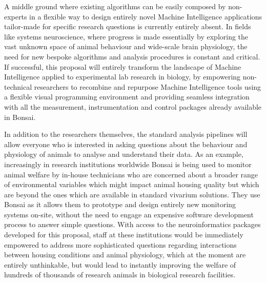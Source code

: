 A middle ground where existing algorithms can be easily composed by non-experts in a flexible way to design entirely novel Machine Intelligence applications tailor-made for specific research questions is currently entirely absent. In fields like systems neuroscience, where progress is made essentially by exploring the vast unknown space of animal behaviour and wide-scale brain physiology, the need for new bespoke algorithms and analysis procedures is constant and critical. If successful, this proposal will entirely transform the landscape of Machine Intelligence applied to experimental lab research in biology, by empowering non-technical researchers to recombine and repurpose Machine Intelligence tools using a flexible visual programming environment and providing seamless integration with all the measurement, instrumentation and control packages already available in Bonsai.

In addition to the researchers themselves, the standard analysis pipelines will allow everyone who is interested in asking questions about the behaviour and physiology of animals to analyse and understand their data. As an example, increasingly in research institutions worldwide Bonsai is being used to monitor animal welfare by in-house technicians who are concerned about a broader range of environmental variables which might impact animal housing quality but which are beyond the ones which are available in standard vivarium solutions. They use Bonsai as it allows them to prototype and design entirely new monitoring systems on-site, without the need to engage an expensive software development process to answer simple questions. With access to the neuroinformatics packages developed for this proposal, staff at these institutions would be immediately empowered to address more sophisticated questions regarding interactions between housing conditions and animal physiology, which at the moment are entirely unthinkable, but would lead to instantly improving the welfare of hundreds of thousands of research animals in biological research facilities.


